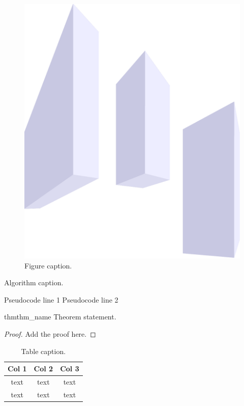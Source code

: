 \begin{figure}[!hbp]
  \centering
  \includegraphics[scale=0.4]{figures/drawing.pdf}
  \caption{Figure caption.} 
  \label{fig: figure_name}
\end{figure}

\begin{algorithm}[!hbt]
  \caption{Algorithm caption.}
  \label{alg: alg_name}
  \begin{algorithmic}
    \State Pseudocode line 1
    \State Pseudocode line 2
  \end{algorithmic}
\end{algorithm}

\begin{restatable}{thm}{thm_name} \label{thm: thm_name}
  Theorem statement.
\end{restatable}
\begin{proof}
  Add the proof here.
\end{proof}

\begin{table}[!hbt]
  \centering
  \begin{tabular}{c|c|c}
    \textbf{Col 1}& \textbf{Col 2} & \textbf{Col 3} \\
    \hline \hline
    text & text & text \\
    \hline
    text & text & text \\
  \end{tabular}
  \caption{Table caption.} 
  \label{table: caption}
\end{table}

